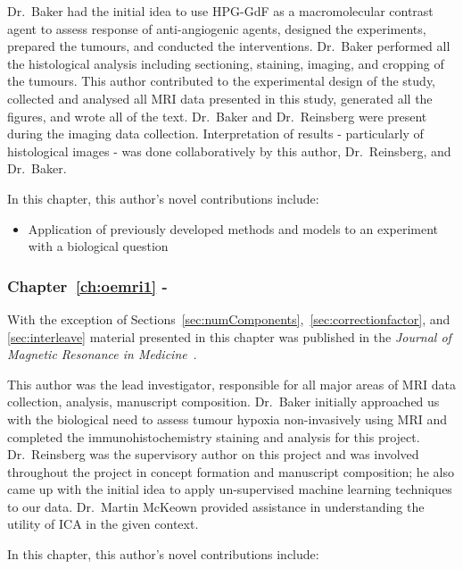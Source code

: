 Dr.\ Baker had the initial idea to use \acs{HPG-GdF} as a macromolecular contrast agent to assess response of anti-angiogenic agents, designed the experiments, prepared the tumours, and conducted the interventions.
Dr.\ Baker performed all the histological analysis including sectioning, staining, imaging, and cropping of the tumours.
This author contributed to the experimental design of the study, collected and analysed all MRI data presented in this study, generated all the figures, and wrote all of the text. 
Dr.\ Baker and Dr.\ Reinsberg were present during the imaging data collection.
Interpretation of results - particularly of histological images - was done collaboratively by this author, Dr.\ Reinsberg, and Dr.\ Baker.

In this chapter, this author's novel contributions include:

\begin{itemize}
\item Application of previously developed methods and models to an experiment with a biological question
\end{itemize}

\subsubsection{Chapter~\ref{ch:oemri1} - }

With the exception of Sections~\ref{sec:numComponents},~\ref{sec:correctionfactor}, and \ref{sec:interleave} material presented in this chapter was published in the \textit{Journal of Magnetic Resonance in Medicine}~\cite{Moosvi:2018ca}. 

This author was the lead investigator, responsible for all major areas of MRI data collection, analysis, manuscript composition. 
Dr.\ Baker initially approached us with the biological need to assess tumour hypoxia non-invasively using MRI and completed the immunohistochemistry staining and analysis for this project. 
Dr.\ Reinsberg was the supervisory author on this project and was involved throughout the project in concept formation and manuscript composition; he also came up with the initial idea to apply un-supervised machine learning techniques to our data. 
Dr.\ Martin McKeown provided assistance in understanding the utility of \acs{ICA} in the given context. 

In this chapter, this author's novel contributions include:

